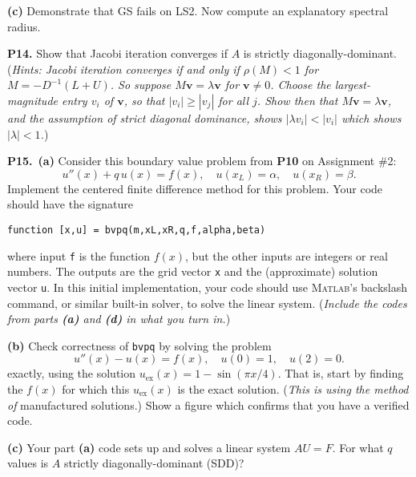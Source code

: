 \documentclass[12pt]{amsart}
\newcommand{\bv}{\mathbf{v}}
\newcommand{\prob}[1]{\bigskip\noindent\textbf{#1.}\quad }
\newcommand{\epart}[1]{\medskip\noindent\textbf{(#1)}\quad }
\newcommand{\ppart}[1]{\,\textbf{(#1)}\quad }
\newcommand{\Matlab}{\textsc{Matlab}\xspace}
\begin{document}
\epart{c}  Demonstrate that GS fails on LS2.  Now compute an explanatory spectral radius.



\prob{P14}  Show that Jacobi iteration converges if $A$ is strictly diagonally-dominant.  (\emph{Hints:  Jacobi iteration converges if and only if $\rho(M) < 1$ for $M = - D^{-1}(L+U)$.  So suppose $M\bv = \lambda \bv$ for $\bv\ne 0$.  Choose the largest-magnitude entry $v_i$ of $\bv$, so that $|v_i| \ge |v_j|$ for all $j$.  Show then that $M\bv=\lambda\bv$, and the assumption of strict diagonal dominance, shows $|\lambda v_i| < |v_i|$ which shows $|\lambda|<1$.})


\prob{P15}  \ppart{a}  Consider this boundary value problem from \textbf{P10} on Assignment \#2:
\begin{equation*}
u''(x) + q\, u(x) = f(x), \quad u(x_L) = \alpha, \quad u(x_R) = \beta. \end{equation*}
Implement the centered finite difference method for this problem.  Your code should have the signature

\centerline{\texttt{function [x,u] = bvpq(m,xL,xR,q,f,alpha,beta)}}

\noindent where input \texttt{f} is the function $f(x)$, but the other inputs are integers or real numbers.  The outputs are the grid vector \texttt{x} and the (approximate) solution vector \texttt{u}.  In this initial implementation, your code should use \Matlab's backslash command, or similar built-in solver, to solve the linear system.  (\emph{Include the codes from parts \textbf{(a)} and \textbf{(d)} in what you turn in.})

\epart{b}  Check correctness of \texttt{bvpq} by solving the problem
\begin{equation*}
u''(x) - u(x) = f(x), \quad u(0) = 1, \quad u(2) = 0.
\end{equation*}
exactly, using the solution $u_{\text{ex}}(x)=1 - \sin(\pi x/4)$.  That is, start by finding the $f(x)$ for which this $u_{\text{ex}}(x)$ is the exact solution.  (\emph{This is using the method of} manufactured solutions.)  Show a figure which confirms that you have a verified code.

\epart{c}  Your part \textbf{(a)} code sets up and solves a linear system $AU=F$.  For what $q$ values is $A$ strictly diagonally-dominant (SDD)?
\end{document}
